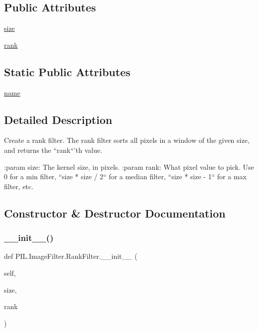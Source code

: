 \subsection*{Public Attributes}
\begin{DoxyCompactItemize}
\item 
\hyperlink{classPIL_1_1ImageFilter_1_1RankFilter_a0bc57f5d65445f9500239870e164a89c}{size}
\item 
\hyperlink{classPIL_1_1ImageFilter_1_1RankFilter_a0c93d894de8bbf6255925952dd0e5b4e}{rank}
\end{DoxyCompactItemize}
\subsection*{Static Public Attributes}
\begin{DoxyCompactItemize}
\item 
\hyperlink{classPIL_1_1ImageFilter_1_1RankFilter_ae321e01d17339ea53fc2882692f25784}{name}
\end{DoxyCompactItemize}


\subsection{Detailed Description}
\begin{DoxyVerb}Create a rank filter.  The rank filter sorts all pixels in
a window of the given size, and returns the ``rank``'th value.

:param size: The kernel size, in pixels.
:param rank: What pixel value to pick.  Use 0 for a min filter,
             ``size * size / 2`` for a median filter, ``size * size - 1``
             for a max filter, etc.
\end{DoxyVerb}
 

\subsection{Constructor \& Destructor Documentation}
\mbox{\label{classPIL_1_1ImageFilter_1_1RankFilter_a9d9e5c89c4735f3f5d258c4e0de51dd3}} 
\subsubsection{\texorpdfstring{\+\_\+\+\_\+init\+\_\+\+\_\+()}{\_\_init\_\_()}}
{\footnotesize\ttfamily def P\+I\+L.\+Image\+Filter.\+Rank\+Filter.\+\_\+\+\_\+init\+\_\+\+\_\+ (\begin{DoxyParamCaption}\item[{}]{self,  }\item[{}]{size,  }\item[{}]{rank }\end{DoxyParamCaption})}



